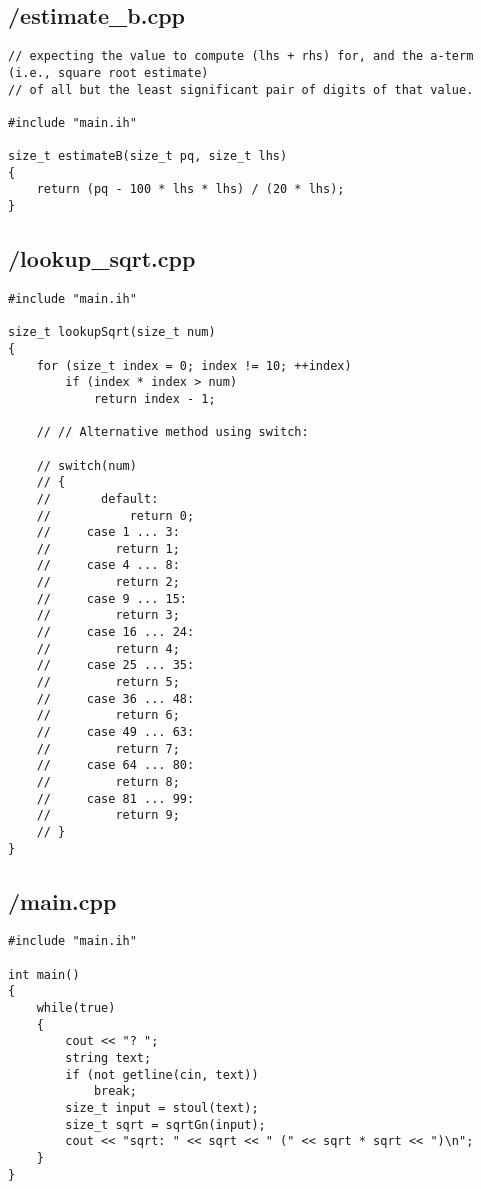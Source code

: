 \documentclass{article}
\begin{document}
\subsection*{/estimate\_b.cpp}
\begin{verbatim}
// expecting the value to compute (lhs + rhs) for, and the a-term (i.e., square root estimate)
// of all but the least significant pair of digits of that value.

#include "main.ih"

size_t estimateB(size_t pq, size_t lhs)
{
    return (pq - 100 * lhs * lhs) / (20 * lhs);
}

\end{verbatim}
\subsection*{/lookup\_sqrt.cpp}
\begin{verbatim}
#include "main.ih"

size_t lookupSqrt(size_t num)
{
    for (size_t index = 0; index != 10; ++index)
        if (index * index > num)
            return index - 1;

    // // Alternative method using switch:

    // switch(num)
    // {
    //       default:
    //           return 0;
    //     case 1 ... 3:
    //         return 1;
    //     case 4 ... 8:
    //         return 2;
    //     case 9 ... 15:
    //         return 3;
    //     case 16 ... 24:
    //         return 4;
    //     case 25 ... 35:
    //         return 5;
    //     case 36 ... 48:
    //         return 6;
    //     case 49 ... 63:
    //         return 7;
    //     case 64 ... 80:
    //         return 8;
    //     case 81 ... 99:
    //         return 9;
    // }
}

\end{verbatim}
\subsection*{/main.cpp}
\begin{verbatim}
#include "main.ih"

int main()
{
    while(true)
    {
        cout << "? ";
        string text;
        if (not getline(cin, text))
            break;
        size_t input = stoul(text);
        size_t sqrt = sqrtGn(input);
        cout << "sqrt: " << sqrt << " (" << sqrt * sqrt << ")\n";
    }
}
\end{verbatim}
\end{document}
